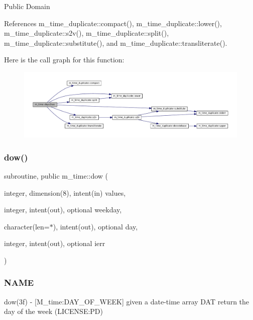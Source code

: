 Public Domain 

References m\+\_\+time\+\_\+duplicate\+::compact(), m\+\_\+time\+\_\+duplicate\+::lower(), m\+\_\+time\+\_\+duplicate\+::s2v(), m\+\_\+time\+\_\+duplicate\+::split(), m\+\_\+time\+\_\+duplicate\+::substitute(), and m\+\_\+time\+\_\+duplicate\+::transliterate().

Here is the call graph for this function\+:\nopagebreak
\begin{figure}[H]
\begin{center}
\leavevmode
\includegraphics[width=350pt]{namespacem__time_a99393c7906f1989f90ece03969224938_cgraph}
\end{center}
\end{figure}
\mbox{\label{namespacem__time_adfda8a89820b8d0ad4581a14896e4ce5}} 
\subsubsection{\texorpdfstring{dow()}{dow()}}
{\footnotesize\ttfamily subroutine, public m\+\_\+time\+::dow (\begin{DoxyParamCaption}\item[{integer, dimension(8), intent(in)}]{values,  }\item[{integer, intent(out), optional}]{weekday,  }\item[{character(len=$\ast$), intent(out), optional}]{day,  }\item[{integer, intent(out), optional}]{ierr }\end{DoxyParamCaption})}



\subsubsection*{N\+A\+ME}

dow(3f) -\/ \mbox{[}M\+\_\+time\+:D\+A\+Y\+\_\+\+O\+F\+\_\+\+W\+E\+EK\mbox{]} given a date-\/time array D\+AT return the day of the week (L\+I\+C\+E\+N\+SE\+:PD) 


